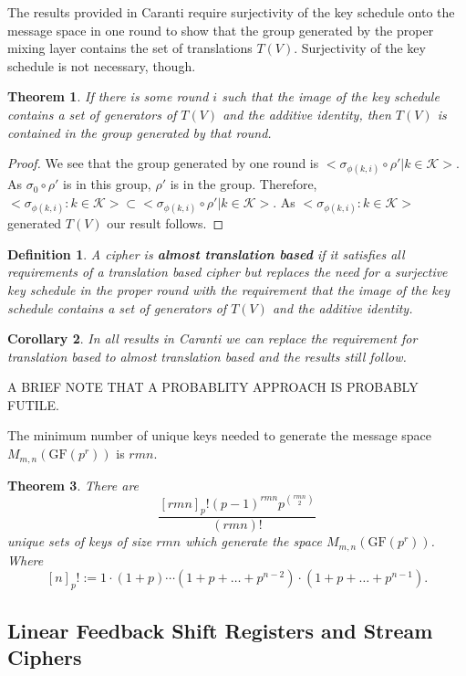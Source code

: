 \documentclass[11pt]{amsart}
\newcommand{\KK}{\mathcal{K}}
\newcommand{\GF}{\mathrm{GF}}
\newtheorem{definition}{{\bf Definition}}
\newtheorem{theorem}{{\bf Theorem }}
\newtheorem{corollary}[theorem]{{\bf Corollary}}
\begin{document}
The results provided in Caranti require surjectivity of the key schedule onto the message space in one round to show that the group generated by the proper mixing layer contains the set of translations $T(V)$. Surjectivity of the key schedule is not necessary, though.
\begin{theorem}
If there is some round $i$ such that the image of the key schedule contains a set of generators of $T(V)$ and the additive identity, then $T(V)$ is contained in the group generated by that round.
\end{theorem}
\begin{proof}
We see that the group generated by one round is $<\sigma_{\phi(k,i)} \circ \rho'| k \in \KK>$. As $\sigma_0 \circ \rho'$ is in this group, $\rho'$ is in the group. Therefore, $<\sigma_{\phi(k,i)} : k \in \KK> \subset <\sigma_{\phi(k,i)} \circ \rho'| k \in \KK>$. As $<\sigma_{\phi(k,i)} : k \in \KK>$ generated $T(V)$ our result follows.
\end{proof}
\begin{definition}
A cipher is \textbf{almost translation based} if it satisfies all requirements of a translation based cipher but replaces the need for a surjective key schedule in the proper round with the requirement that the image of the key schedule contains a set of generators of $T(V)$ and the additive identity.
\end{definition}
\begin{corollary}
In all results in Caranti we can replace the requirement for translation based to almost translation based and the results still follow.
\end{corollary}

A BRIEF NOTE THAT A PROBABLITY APPROACH IS PROBABLY FUTILE.

    The minimum number of unique keys needed to generate the message space $M_{m,n}(\GF(p^r))$ is $rmn$.

\begin{theorem}
There are
    \[
    \frac{[rmn]_p! (p - 1)^{rmn} p^{\binom{rmn}{2}}}{(rmn)!}
    \]
unique sets of keys of size $rmn$ which generate the space $M_{m,n}(\GF(p^r))$. Where
    \[
    [n]_p! := 1 \cdot (1 + p) \cdots (1 + p + \dots + p^{n-2}) \cdot (1 + p + \dots + p^{n-1}).
    \]
\end{theorem}



\subsection{Linear Feedback Shift Registers and Stream Ciphers}
\end{document}
